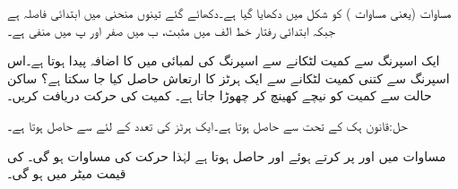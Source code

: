 مساوات  (یعنی مساوات ) کو شکل  میں دکھایا گیا ہے۔دکھائے گئے تینوں منحنی میں ابتدائی فاصلہ  ہے جبکہ ابتدائی رفتار  خط الف میں مثبت، ب میں صفر اور پ میں منفی ہے۔

ایک اسپرنگ سے  کمیت لٹکانے سے اسپرنگ کی لمبائی میں  کا اضافہ پیدا ہوتا ہے۔اس اسپرنگ سے کتنی کمیت لٹکانے سے ایک ہرٹز  کا ارتعاش حاصل کیا جا سکتا ہے؟ ساکن حالت سے کمیت کو  نیچے کھینچ کر چھوڑا جاتا ہے۔ کمیت کی حرکت دریافت کریں۔

حل:قانون ہک کے تحت  سے  حاصل ہوتا ہے۔ایک ہرٹز کی تعدد کے لئے  سے  حاصل ہوتا ہے۔

مساوات  میں  اور  پر کرتے ہوئے  اور  حاصل ہوتا ہے لہٰذا حرکت کی مساوات  ہو گی۔ کی قیمت میٹر میں ہو گی۔

